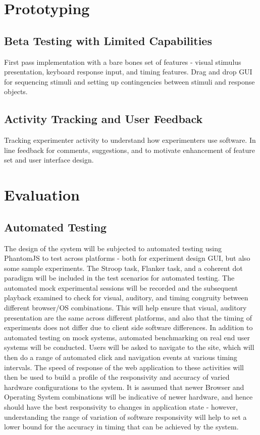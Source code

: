 \documentclass[12pt,a4paper,titlepage]{scrreprt}
\begin{document}
\section{Prototyping}
\subsection{Beta Testing with Limited Capabilities}
First pass implementation with a bare bones set of features - visual stimulus presentation, keyboard response input, and timing features. Drag and drop GUI for sequencing stimuli and setting up contingencies between stimuli and response objects.
\subsection{Activity Tracking and User Feedback}
Tracking experimenter activity to understand how experimenters use software. In line feedback for comments, suggestions, and to motivate enhancement of feature set and user interface design.
\section{Evaluation}
\subsection{Automated Testing}
The design of the system will be subjected to automated testing using PhantomJS \parencite{_phantomjs_????} to test across platforms - both for experiment design GUI, but also some sample experiments. The Stroop task, Flanker task, and a coherent dot paradigm will be included in the test scenarios for automated testing. The automated mock experimental sessions  will be recorded and the subsequent playback examined to check for visual, auditory, and timing congruity between different browser/OS combinations. This will help ensure that visual, auditory presentation are the same across different platforms, and also that the timing of experiments does not differ due to client side software differences.
In addition to automated testing on mock systems, automated benchmarking on real end user systems will be conducted. Users will be asked to navigate to the site, which will then do a range of automated click and navigation events at various timing intervals. The speed of response of the web application to these activities will then be used to build a profile of the responsivity and accuracy of varied hardware configurations to the system. It is assumed that newer Browser and Operating System combinations will be indicative of newer hardware, and hence should have the best responsivity to changes in application state - however, understanding the range of variation of software responsivity will help to set a lower bound for the accuracy in timing that can be achieved by the system.
\end{document}
